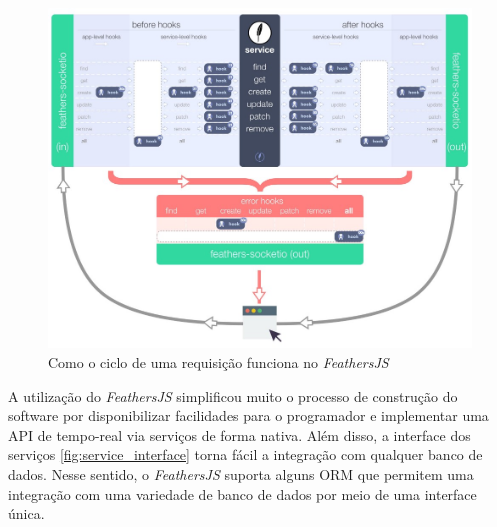 \begin{figure}
  \centering
  \includegraphics[scale=0.45,valign=t]{imagens/feathers_request.jpeg}
  \caption{Como o ciclo de uma requisição funciona no \textit{FeathersJS}}
  \label{fig:feathers_request}
\end{figure}

A utilização do \textit{FeathersJS} simplificou muito o processo de construção
do software por disponibilizar facilidades para o programador e implementar
uma API de tempo-real via serviços de forma nativa. Além disso, a interface dos
serviços \autoref{fig:service_interface} torna fácil a integração com qualquer banco de dados.
Nesse sentido, o \textit{FeathersJS} suporta alguns ORM que permitem uma integração
com uma variedade de banco de dados por meio de uma interface única.

